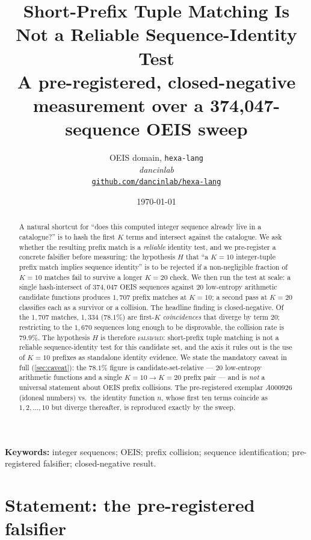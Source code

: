 \documentclass[11pt,a4paper]{article}
\title{
  \textbf{Short-Prefix Tuple Matching Is Not a Reliable
  Sequence-Identity Test}\\[4pt]
  \large A pre-registered, closed-negative measurement over a
  374{,}047-sequence OEIS sweep
}
\author{
  OEIS domain, \texttt{hexa-lang}\\
  \normalsize\textit{dancinlab}\\[2pt]
  \normalsize\href{https://github.com/dancinlab/hexa-lang}{\texttt{github.com/dancinlab/hexa-lang}}
}
\date{\today}
\newcommand{\Kten}{K\!=\!10}
\newcommand{\Ktwenty}{K\!=\!20}
\theoremstyle{definition}
\begin{document}
\maketitle

\begin{abstract}
A natural shortcut for ``does this computed integer sequence already live in a
catalogue?'' is to hash the first $K$ terms and intersect against the
catalogue. We ask whether the resulting prefix match is a \emph{reliable}
identity test, and we pre-register a concrete falsifier before measuring: the
hypothesis $H$ that ``a $\Kten$ integer-tuple prefix match implies sequence
identity'' is to be rejected if a non-negligible fraction of $\Kten$ matches
fail to survive a longer $\Ktwenty$ check. We then run the test at scale: a
single hash-intersect of $374{,}047$ OEIS sequences against $20$ low-entropy
arithmetic candidate functions produces $1{,}707$ prefix matches at $\Kten$; a
second pass at $\Ktwenty$ classifies each as a survivor or a collision. The
headline finding is closed-negative. Of the $1{,}707$ matches, $1{,}334$
($78.1\%$) are first-$K$ \emph{coincidences} that diverge by term $20$;
restricting to the $1{,}670$ sequences long enough to be disprovable, the
collision rate is $79.9\%$. The hypothesis $H$ is therefore \textsc{falsified}:
short-prefix tuple matching is not a reliable sequence-identity test for this
candidate set, and the axis it rules out is the use of $\Kten$ prefixes as
standalone identity evidence. We state the mandatory caveat in full
(\textsection\ref{sec:caveat}): the $78.1\%$ figure is candidate-set-relative
--- $20$ low-entropy arithmetic functions and a single $\Kten\!\to\!\Ktwenty$
prefix pair --- and is \emph{not} a universal statement about OEIS prefix
collisions. The pre-registered exemplar $A000926$ (idoneal numbers) vs.\ the
identity function $n$, whose first ten terms coincide as $1,2,\dots,10$ but
diverge thereafter, is reproduced exactly by the sweep.
\end{abstract}

\noindent\textbf{Keywords:} integer sequences; OEIS; prefix collision; sequence
identification; pre-registered falsifier; closed-negative result.

\section{Statement: the pre-registered falsifier}
\label{sec:statement}
\end{document}
